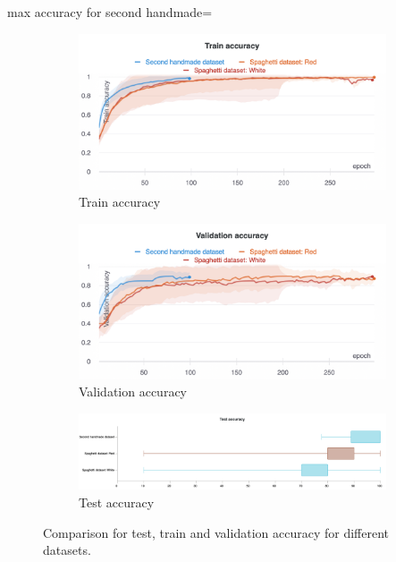 	max accuracy for second handmade=
	\begin{figure}[hbtp]
		\begin{subfigure}{0.49\textwidth}
		\centering
		\includegraphics[width=\linewidth]{fig/results/wandb/spaghetti_vs_secondhandmade/charts/Section-2-Panel-0-d9vatkbok}
		\caption{Train accuracy}
		\label{fig:res:comp:tra}
		\end{subfigure}
		\hspace*{\fill}
		\begin{subfigure}{0.49\textwidth}
		\centering
		\includegraphics[width=\linewidth]{fig/results/wandb/spaghetti_vs_secondhandmade/charts/Section-2-Panel-1-h8kizzbrm}
		\caption{Validation accuracy}
		\label{fig:res:comp:va}
		\end{subfigure}
		\hspace*{\fill}
		\begin{subfigure}{0.6\textwidth}
		\centering
		\includegraphics[width=\linewidth]{fig/results/wandb/spaghetti_vs_secondhandmade/charts/Section-2-Panel-2-mwwjkupji}
		\caption{Test accuracy}
		\label{fig:res:comp:ta}
		\end{subfigure}
		\caption{Comparison for test, train and validation accuracy for different datasets.}
		\label{fig:res:comp}
	\end{figure}
	
